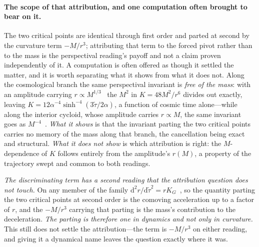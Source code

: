 \documentclass[11pt,a4paper]{article}
\theoremstyle{definition}
\newcommand{\dd}{\mathrm{d}}   %
\begin{document}
\paragraph{The scope of that attribution, and one computation often brought to bear on it.} The two critical points are identical through first order and parted at second by the curvature term $-M/r^{3}$; attributing that term to the forced pivot rather than to the mass is the perspectival reading's payoff and not a claim proven independently of it. A computation is often offered as though it settled the matter, and it is worth separating what it shows from what it does not. Along the cosmological branch the same perspectival invariant is \emph{free of the mass}: with an amplitude carrying $r\propto M^{1/3}$~\cite{JanzenCRframework} the $M^{2}$ in $K=48M^{2}/r^{6}$ divides out exactly, leaving $K=12\alpha^{-4}\sinh^{-4}(3\tilde\tau/2\alpha)$, a function of cosmic time alone---while along the interior cycloid, whose amplitude carries $r\propto M$, the same invariant goes as $M^{-4}$~\cite{JanzenCircle}. \emph{What it shows} is that the invariant parting the two critical points carries no memory of the mass along that branch, the cancellation being exact and structural. \emph{What it does not show} is which attribution is right: the $M$-dependence of $K$ follows entirely from the amplitude's $r(M)$, a property of the trajectory swept and common to both readings.

\emph{The discriminating term has a second reading that the attribution question does not touch.} On any member of the family $\dd^{2}r/\dd\tilde\tau^{2}=rK_{G}$~\cite{JanzenSlicing}, so the quantity parting the two critical points at second order is the comoving acceleration up to a factor of $r$, and the $-M/r^{3}$ carrying that parting is the mass's contribution to the deceleration. \emph{The parting is therefore one in dynamics and not only in curvature.} This still does not settle the attribution---the term is $-M/r^{3}$ on either reading, and giving it a dynamical name leaves the question exactly where it was.
\end{document}
